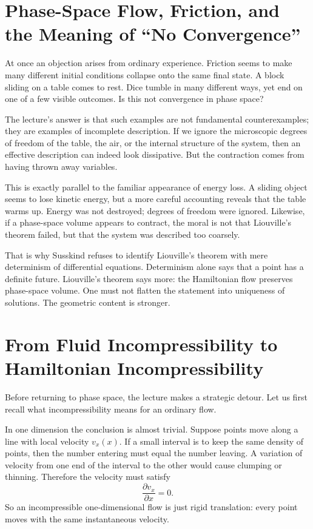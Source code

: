 \section{Phase-Space Flow, Friction, and the Meaning of ``No Convergence''}

At once an objection arises from ordinary experience. Friction seems to make many different initial conditions collapse onto the same final state. A block sliding on a table comes to rest. Dice tumble in many different ways, yet end on one of a few visible outcomes. Is this not convergence in phase space?

The lecture's answer is that such examples are not fundamental counterexamples; they are examples of incomplete description. If we ignore the microscopic degrees of freedom of the table, the air, or the internal structure of the system, then an effective description can indeed look dissipative. But the contraction comes from having thrown away variables.

This is exactly parallel to the familiar appearance of energy loss. A sliding object seems to lose kinetic energy, but a more careful accounting reveals that the table warms up. Energy was not destroyed; degrees of freedom were ignored. Likewise, if a phase-space volume appears to contract, the moral is not that Liouville's theorem failed, but that the system was described too coarsely.

That is why Susskind refuses to identify Liouville's theorem with mere determinism of differential equations. Determinism alone says that a point has a definite future. Liouville's theorem says more: the Hamiltonian flow preserves phase-space volume. One must not flatten the statement into uniqueness of solutions. The geometric content is stronger.

\section{From Fluid Incompressibility to Hamiltonian Incompressibility}

Before returning to phase space, the lecture makes a strategic detour. Let us first recall what incompressibility means for an ordinary flow.

In one dimension the conclusion is almost trivial. Suppose points move along a line with local velocity \(v_x(x)\). If a small interval is to keep the same density of points, then the number entering must equal the number leaving. A variation of velocity from one end of the interval to the other would cause clumping or thinning. Therefore the velocity must satisfy
\begin{equation}
\frac{\partial v_x}{\partial x}=0.
\end{equation}
So an incompressible one-dimensional flow is just rigid translation: every point moves with the same instantaneous velocity.

